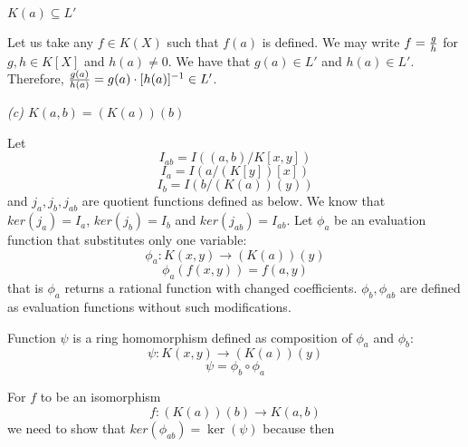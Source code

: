 \documentclass{article}
\begin{document}

$K(a)\subseteq L'$

Let us take any $f\in K(X)$ such that $f(a)$ is defined. We may write $f={g\over h}$ for $g,h\in K[X]$ and $h(a)\neq 0$. We have that $g(a)\in L'$ and $h(a)\in L'$. Therefore, ${g(a)\over h(a)}=g(a)\cdot[h(a)]^{-1}\in L'$.
\smallskip

\emph{\color{pink}(c) $K(a, b)=(K(a))(b)$}
\smallskip

Let 
$$I_{ab}=I((a, b)/K[x, y])$$
$$I_a=I(a/(K[y])[x])$$
$$I_b=I(b/(K(a))(y))$$
and $j_a,j_b, j_{ab}$ are quotient functions defined as below. We know that $ker(j_a)=I_a$, $ker(j_b)=I_b$ and $ker(j_{ab})=I_{ab}$. Let $\phi_a$ be an evaluation function that substitutes only one variable:
$$\phi_a:K(x, y)\to (K(a))(y)$$
$$\phi_a(f(x, y))=f(a, y)$$
that is $\phi_a$ returns a rational function with changed coefficients. $\phi_b, \phi_{ab}$ are defined as evaluation functions without such modifications.

\begin{center}\end{center}

Function $\psi$ is a ring homomorphism defined as composition of $\phi_a$ and $\phi_b$:
$$\psi:K(x, y)\to(K(a))(y)$$
$$\psi=\phi_b\circ\phi_a$$

For $f$ to be an isomorphism
$$f:(K(a))(b)\to K(a, b)$$
we need to show that $ker(\phi_{ab})=\ker(\psi)$ because then
\begin{center}
\end{center}
\end{document}
